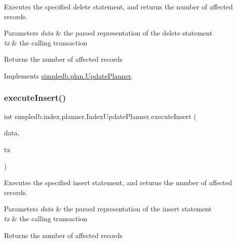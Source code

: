 Executes the specified delete statement, and returns the number of affected records. 
\begin{DoxyParams}{Parameters}
{\em data} & the parsed representation of the delete statement \\
\hline
{\em tx} & the calling transaction \\
\hline
\end{DoxyParams}
\begin{DoxyReturn}{Returns}
the number of affected records 
\end{DoxyReturn}


Implements \hyperlink{interfacesimpledb_1_1plan_1_1UpdatePlanner_a7141a96cb092881cc149f0804bbafc20}{simpledb.\+plan.\+Update\+Planner}.

\mbox{\label{classsimpledb_1_1index_1_1planner_1_1IndexUpdatePlanner_ab6e0638b0692e80ec5685ce0b75214a9}} 
\subsubsection{\texorpdfstring{execute\+Insert()}{executeInsert()}}
{\footnotesize\ttfamily int simpledb.\+index.\+planner.\+Index\+Update\+Planner.\+execute\+Insert (\begin{DoxyParamCaption}\item[{\hyperlink{classsimpledb_1_1parse_1_1InsertData}{Insert\+Data}}]{data,  }\item[{\hyperlink{classsimpledb_1_1tx_1_1Transaction}{Transaction}}]{tx }\end{DoxyParamCaption})\hspace{0.3cm}{\ttfamily [inline]}}

Executes the specified insert statement, and returns the number of affected records. 
\begin{DoxyParams}{Parameters}
{\em data} & the parsed representation of the insert statement \\
\hline
{\em tx} & the calling transaction \\
\hline
\end{DoxyParams}
\begin{DoxyReturn}{Returns}
the number of affected records 
\end{DoxyReturn}


